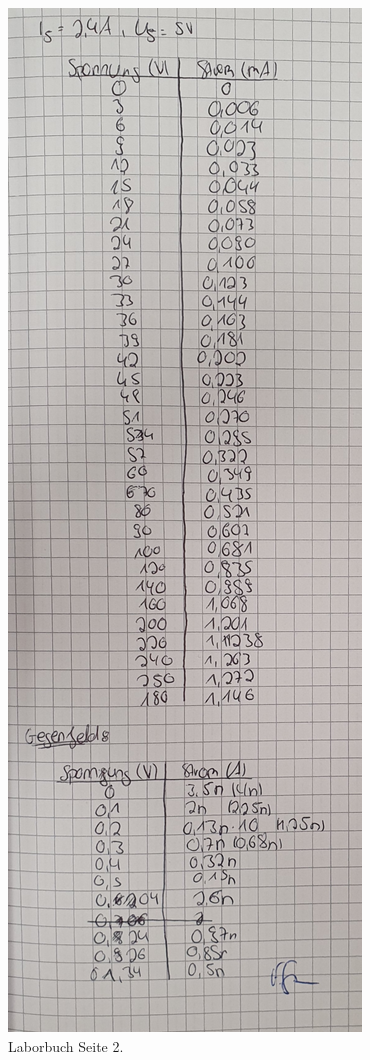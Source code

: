 \begin{figure}[H]
    \centering
    \includegraphics[height=0.9\textheight]{content/Laborbuch2.jpg}
    \caption{Laborbuch Seite 2.}
\end{figure}




%
